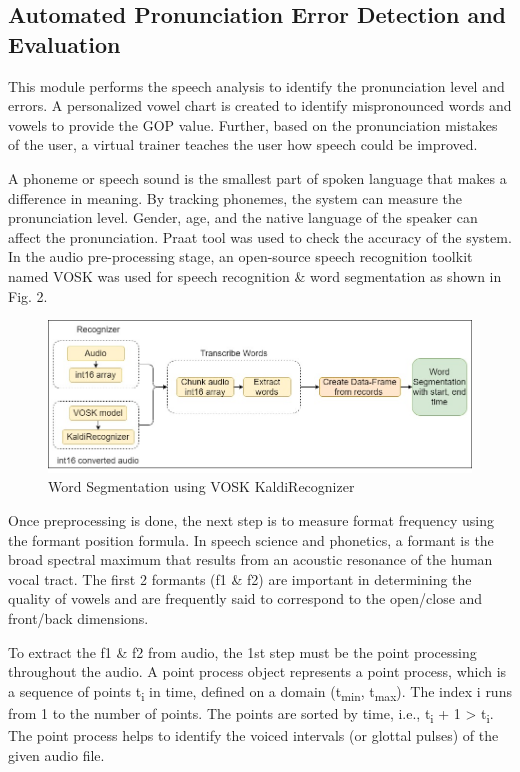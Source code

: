 \documentclass[conference]{IEEEtran}
\begin{document}
\subsection{Automated Pronunciation Error Detection and Evaluation}

This module performs the speech analysis to identify the pronunciation level and errors. A personalized vowel chart is created to identify mispronounced words and vowels to provide the GOP value. Further, based on the pronunciation mistakes of the user, a virtual trainer teaches the user how speech could be improved.

A phoneme or speech sound is the smallest part of spoken language that makes a difference in meaning. By tracking phonemes, the system can measure the pronunciation level. Gender, age, and the native language of the speaker can affect the pronunciation. Praat tool was used to check the accuracy of the system. In the audio pre-processing stage, an open-source speech recognition toolkit named VOSK was used for speech recognition \& word segmentation as shown in Fig. 2.

\begin{figure}[htbp]
\centerline{\includegraphics[scale=0.28]{it18151220_word_segemntation.jpg}}
\caption{Word Segmentation using VOSK KaldiRecognizer}
\end{figure}

Once preprocessing is done, the next step is to measure format frequency using the formant position formula. In speech science and phonetics, a formant is the broad spectral maximum that results from an acoustic resonance of the human vocal tract. The first 2 formants (f1 \& f2) are important in determining the quality of vowels and are frequently said to correspond to the open/close and front/back dimensions.

To extract the f1 \& f2 from audio, the 1st step must be the point processing throughout the audio. A point process object represents a point process, which is a sequence of points t\textsubscript{i} in time, defined on a domain (t\textsubscript{min}, t\textsubscript{max}). The index i runs from 1 to the number of points. The points are sorted by time, i.e., t\textsubscript{i} + 1 \textgreater \! t\textsubscript{i}. The point process helps to identify the voiced intervals (or glottal pulses) of the given audio file.
\end{document}
